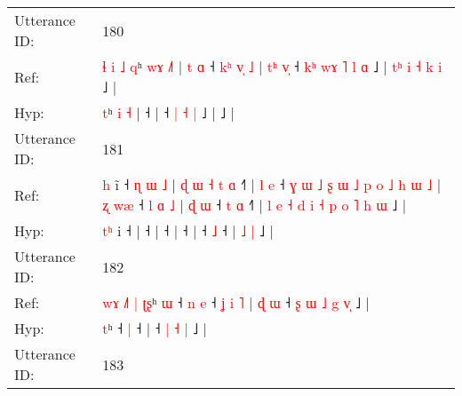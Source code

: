 \documentclass[10pt]{article}
\DeclareRobustCommand{\hl}[1]{{\textcolor{red}{#1}}}
\begin{document}
\begin{longtable}{ll}
\midrule
Utterance ID: & 180 \\
Ref: & \hl{ɬ}\hl{ }\hl{i}\hl{ }\hl{˩}\hl{ }\hl{q}ʰ \hl{w}\hl{ɤ} \hl{˩}\hl{˥} |\hl{ }\hl{t}\hl{ }\hl{ɑ} ˧\hl{ }\hl{k}\hl{ʰ}\hl{ }\hl{v}\hl{̩}\hl{ }\hl{˩} |\hl{ }\hl{t}\hl{ʰ}\hl{ }\hl{v}\hl{̩} ˧\hl{ }\hl{k}\hl{ʰ}\hl{ }\hl{w}\hl{ɤ} \hl{˥} \hl{l} \hl{ɑ} ˩ |\hl{ }\hl{t}\hl{ʰ}\hl{ }\hl{i}\hl{ }\hl{˧}\hl{ }\hl{k}\hl{ }\hl{i} ˩ |
 \\
Hyp: & \hl{}\hl{}\hl{}\hl{}\hl{}\hl{}\hl{t}ʰ \hl{}\hl{i} \hl{}\hl{˧} |\hl{}\hl{}\hl{}\hl{} ˧\hl{}\hl{}\hl{}\hl{}\hl{}\hl{}\hl{}\hl{} |\hl{}\hl{}\hl{}\hl{}\hl{}\hl{} ˧\hl{}\hl{}\hl{}\hl{}\hl{}\hl{} \hl{|} \hl{˧} \hl{|} ˩ |\hl{}\hl{}\hl{}\hl{}\hl{}\hl{}\hl{}\hl{}\hl{}\hl{}\hl{} ˩ |
 \\
\midrule
Utterance ID: & 181 \\
Ref: & \hl{}\hl{h} i\hl{̃} ˧\hl{ }\hl{ɳ}\hl{ }\hl{ɯ}\hl{ }\hl{˩} |\hl{ }\hl{ɖ}\hl{ }\hl{ɯ}\hl{ }\hl{˧}\hl{ }\hl{t}\hl{ }\hl{ɑ} ˧\hl{˥} |\hl{ }\hl{l}\hl{ }\hl{e} ˧\hl{ }\hl{ɣ}\hl{ }\hl{ɯ}\hl{ }\hl{˩}\hl{ }\hl{ʂ}\hl{ }\hl{ɯ}\hl{ }\hl{˩}\hl{ }\hl{p}\hl{ }\hl{o}\hl{ }\hl{˩}\hl{ }\hl{h}\hl{ }\hl{ɯ}\hl{ }\hl{˩} |\hl{ }\hl{ʐ}\hl{ }\hl{w}\hl{æ} ˧\hl{ }\hl{l}\hl{ }\hl{ɑ}\hl{ }\hl{˩} |\hl{ }\hl{ɖ}\hl{ }\hl{ɯ} ˧\hl{ }\hl{t} \hl{ɑ} ˧\hl{˥} |\hl{ }\hl{l}\hl{ }\hl{e}\hl{ }\hl{˧}\hl{ }\hl{d}\hl{ }\hl{i}\hl{ }\hl{˧}\hl{ }\hl{p}\hl{ }\hl{o}\hl{ }\hl{˥} \hl{h} \hl{ɯ} ˩ |
 \\
Hyp: & \hl{t}\hl{ʰ} i\hl{} ˧\hl{}\hl{}\hl{}\hl{}\hl{}\hl{} |\hl{}\hl{}\hl{}\hl{}\hl{}\hl{}\hl{}\hl{}\hl{}\hl{} ˧\hl{} |\hl{}\hl{}\hl{}\hl{} ˧\hl{}\hl{}\hl{}\hl{}\hl{}\hl{}\hl{}\hl{}\hl{}\hl{}\hl{}\hl{}\hl{}\hl{}\hl{}\hl{}\hl{}\hl{}\hl{}\hl{}\hl{}\hl{}\hl{}\hl{} |\hl{}\hl{}\hl{}\hl{}\hl{} ˧\hl{}\hl{}\hl{}\hl{}\hl{}\hl{} |\hl{}\hl{}\hl{}\hl{} ˧\hl{}\hl{} \hl{˩} ˧\hl{} |\hl{}\hl{}\hl{}\hl{}\hl{}\hl{}\hl{}\hl{}\hl{}\hl{}\hl{}\hl{}\hl{}\hl{}\hl{}\hl{}\hl{}\hl{} \hl{˩} \hl{|} ˩ |
 \\
\midrule
Utterance ID: & 182 \\
Ref: & \hl{w}\hl{ɤ}\hl{ }\hl{˩}\hl{˥}\hl{ }\hl{|}\hl{ }\hl{ʈ}\hl{ʂ}ʰ\hl{ }\hl{ɯ} ˧\hl{ }\hl{n} \hl{e} ˧\hl{ }\hl{ʝ}\hl{ }\hl{i}\hl{ }\hl{˥} |\hl{ }\hl{ɖ}\hl{ }\hl{ɯ} ˧\hl{ }\hl{ʂ}\hl{ }\hl{ɯ} \hl{˩} \hl{g} \hl{v}\hl{̩} ˩ |
 \\
Hyp: & \hl{}\hl{}\hl{}\hl{}\hl{}\hl{}\hl{}\hl{}\hl{}\hl{t}ʰ\hl{}\hl{} ˧\hl{}\hl{} \hl{|} ˧\hl{}\hl{}\hl{}\hl{}\hl{}\hl{} |\hl{}\hl{}\hl{}\hl{} ˧\hl{}\hl{}\hl{}\hl{} \hl{|} \hl{˧} \hl{}\hl{|} ˩ |
 \\
\midrule
Utterance ID: & 183 \\

\end{longtable}
\end{document}
